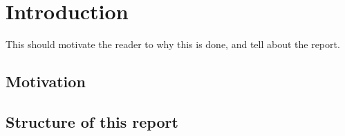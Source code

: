 
\chapter{Introduction}
This should motivate the reader to why this is done, and tell about the report. 


\section{Motivation}



\section{Structure of this report}


